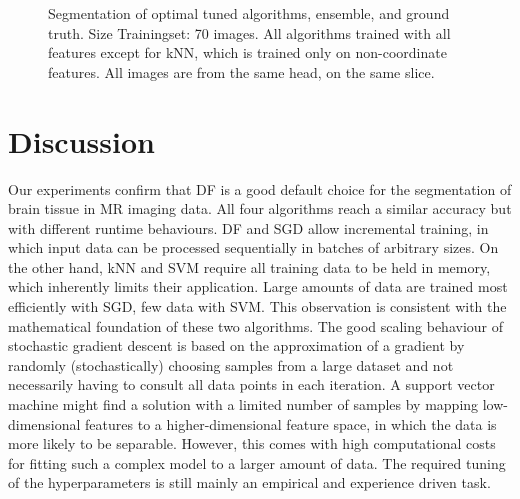 \documentclass[journal]{IEEEtran}
\begin{document}
\begin{figure}[h!]
	\hfill
	\caption{Segmentation of optimal tuned algorithms, ensemble, and ground truth. Size Trainingset: 70 images. All algorithms trained with all features except for kNN, which is trained only on non-coordinate features. All images are from the same head, on the same slice. }
	\label{f.slices_all}
\end{figure}

\section{Discussion}

Our experiments confirm that DF is a good default choice for the segmentation of brain tissue in MR imaging data. All four algorithms reach a similar accuracy but with different runtime behaviours. DF and SGD allow incremental training, in which input data can be processed sequentially in batches of arbitrary sizes. On the other hand, kNN and SVM require all training data to be held in memory, which inherently limits their application. Large amounts of data are trained most efficiently with SGD, few data with SVM. This observation is consistent with the mathematical foundation of these two algorithms. The good scaling behaviour of stochastic gradient descent is based on the approximation of a gradient by randomly (stochastically) choosing samples from a large dataset and not necessarily having to consult all data points in each iteration. A support vector machine might find a solution with a limited number of samples by mapping low-dimensional features to a higher-dimensional feature space, in which the data is more likely to be separable. However, this comes with high computational costs for fitting such a complex model to a larger amount of data. The required tuning of the hyperparameters is still mainly an empirical and experience driven task.
\end{document}
